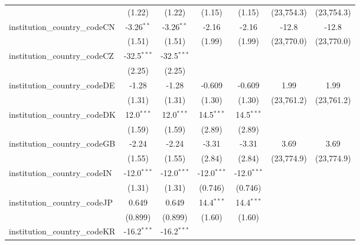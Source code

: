 \begin{tabular}{lcccccc}
                                         & (1.22)        & (1.22)        & (1.15)        & (1.15)        & (23,754.3)   & (23,754.3)\\   
   institution\_country\_codeCN          & -3.26$^{**}$  & -3.26$^{**}$  & -2.16         & -2.16         & -12.8        & -12.8\\   
                                         & (1.51)        & (1.51)        & (1.99)        & (1.99)        & (23,770.0)   & (23,770.0)\\   
   institution\_country\_codeCZ          & -32.5$^{***}$ & -32.5$^{***}$ &               &               &              &   \\   
                                         & (2.25)        & (2.25)        &               &               &              &   \\   
   institution\_country\_codeDE          & -1.28         & -1.28         & -0.609        & -0.609        & 1.99         & 1.99\\   
                                         & (1.31)        & (1.31)        & (1.30)        & (1.30)        & (23,761.2)   & (23,761.2)\\   
   institution\_country\_codeDK          & 12.0$^{***}$  & 12.0$^{***}$  & 14.5$^{***}$  & 14.5$^{***}$  &              &   \\   
                                         & (1.59)        & (1.59)        & (2.89)        & (2.89)        &              &   \\   
   institution\_country\_codeGB          & -2.24         & -2.24         & -3.31         & -3.31         & 3.69         & 3.69\\   
                                         & (1.55)        & (1.55)        & (2.84)        & (2.84)        & (23,774.9)   & (23,774.9)\\   
   institution\_country\_codeIN          & -12.0$^{***}$ & -12.0$^{***}$ & -12.0$^{***}$ & -12.0$^{***}$ &              &   \\   
                                         & (1.31)        & (1.31)        & (0.746)       & (0.746)       &              &   \\   
   institution\_country\_codeJP          & 0.649         & 0.649         & 14.4$^{***}$  & 14.4$^{***}$  &              &   \\   
                                         & (0.899)       & (0.899)       & (1.60)        & (1.60)        &              &   \\   
   institution\_country\_codeKR          & -16.2$^{***}$ & -16.2$^{***}$ &               &               &              &   \\   

\end{tabular}

